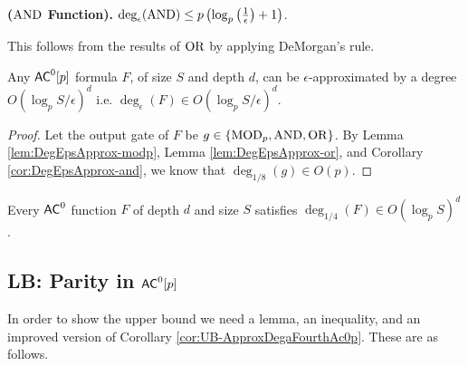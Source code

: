 \documentclass[11pt]{article}
\begin{document}
	\begin{corollary}
		\label{cor:DegEpsApprox-and}
		\textbf{($\mathrm{AND}$ Function).} $\deg_{\epsilon}(\mathrm{AND}) \leq p\left(\log_p\left(\frac{1}{\epsilon}\right) + 1\right)$.
	\end{corollary}
	This follows from the results of $\mathrm{OR}$ by applying DeMorgan's rule. 
	
	\begin{lemma}
		\label{lem:UB-ApproxDegAc0pFormula1}
		Any $\mathsf{AC}^0[p]$ formula $F$, of size $S$ and depth $d$, can be $\epsilon$-approximated by a degree $O(\log_{p} S/\epsilon)^d$ i.e. $\deg_{\epsilon}(F) \in O(\log_{p} S/\epsilon)^d$. 
	\end{lemma}
	\begin{proof}
		Let the output gate of $F$ be $g \in \{\mathrm{MOD}_p, \mathrm{AND}, \mathrm{OR}\}$. By Lemma \ref{lem:DegEpsApprox-modp}, Lemma \ref{lem:DegEpsApprox-or}, and Corollary \ref{cor:DegEpsApprox-and}, we know that $\deg_{1/8}(g) \in O(p)$.
	\end{proof}

	\begin{corollary}
		\label{cor:UB-ApproxDegaFourthAc0p}
		Every $\mathsf{AC}^0$ function $F$ of depth $d$ and size $S$ satisfies $\deg_{1/4}(F) \in O(\log_p S)^d$.
	\end{corollary}
	
	\subsection{LB: Parity in  \texorpdfstring{$\mathsf{AC}^0[p]$}{AC0[p]}}
	In order to show the upper bound we need a lemma, an inequality, and an improved version of Corollary	\ref{cor:UB-ApproxDegaFourthAc0p}. These are as follows.
	
\end{document}
